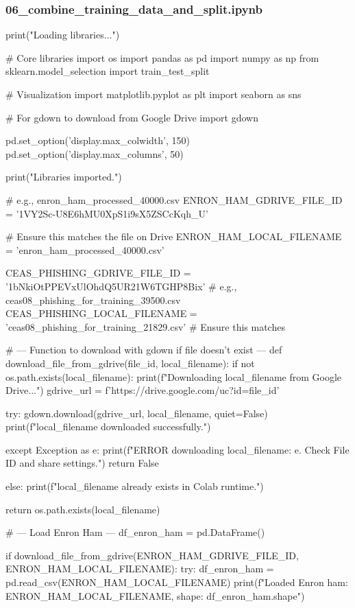 \subsubsection*{06\_combine\_training\_data\_and\_split.ipynb}

\begin{ffcode}
print("Loading libraries...")

# Core libraries
import os
import pandas as pd
import numpy as np
from sklearn.model_selection import train_test_split

# Visualization
import matplotlib.pyplot as plt
import seaborn as sns

# For gdown to download from Google Drive
import gdown

pd.set_option('display.max_colwidth', 150)
pd.set_option('display.max_columns', 50)

print("Libraries imported.\n")

# e.g., enron_ham_processed_40000.csv
ENRON_HAM_GDRIVE_FILE_ID = '1VY2Sc-U8E6hMU0XpS1i9sX5ZSCcKqh_U'

# Ensure this matches the file on Drive
ENRON_HAM_LOCAL_FILENAME = 'enron_ham_processed_40000.csv'

CEAS_PHISHING_GDRIVE_FILE_ID = '1bNkiOtPPEVxUlOhdQ5UR21W6TGHP8Bix' # e.g., ceas08_phishing_for_training_39500.csv
CEAS_PHISHING_LOCAL_FILENAME = 'ceas08_phishing_for_training_21829.csv' # Ensure this matches

# --- Function to download with gdown if file doesn't exist ---
def download_file_from_gdrive(file_id, local_filename):
    if not os.path.exists(local_filename):
        print(f"Downloading {local_filename} from Google Drive...")
        gdrive_url = f'https://drive.google.com/uc?id={file_id}'

        try:
            gdown.download(gdrive_url, local_filename, quiet=False)
            print(f"{local_filename} downloaded successfully.")

        except Exception as e:
            print(f"ERROR downloading {local_filename}: {e}. Check File ID and share settings.")
            return False

    else:
        print(f"{local_filename} already exists in Colab runtime.")

    return os.path.exists(local_filename)

# --- Load Enron Ham ---
df_enron_ham = pd.DataFrame()

if download_file_from_gdrive(ENRON_HAM_GDRIVE_FILE_ID, ENRON_HAM_LOCAL_FILENAME):
    try:
        df_enron_ham = pd.read_csv(ENRON_HAM_LOCAL_FILENAME)
        print(f"Loaded Enron ham: {ENRON_HAM_LOCAL_FILENAME}, shape: {df_enron_ham.shape}")


\end{ffcode}

